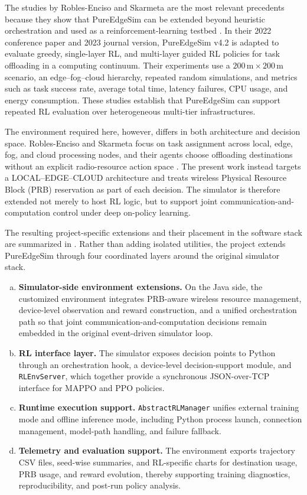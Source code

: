 The studies by Robles-Enciso and Skarmeta are the most relevant precedents because they show that PureEdgeSim can be extended beyond heuristic orchestration and used as a reinforcement-learning testbed \cite{robles2022continuum, robles2023multilayer}. In their 2022 conference paper and 2023 journal version, PureEdgeSim v4.2 is adapted to evaluate greedy, single-layer RL, and multi-layer guided RL policies for task offloading in a computing continuum. Their experiments use a \(200\,\mathrm{m} \times 200\,\mathrm{m}\) scenario, an edge--fog--cloud hierarchy, repeated random simulations, and metrics such as task success rate, average total time, latency failures, CPU usage, and energy consumption. These studies establish that PureEdgeSim can support repeated RL evaluation over heterogeneous multi-tier infrastructures.

The environment required here, however, differs in both architecture and decision space. Robles-Enciso and Skarmeta focus on task assignment across local, edge, fog, and cloud processing nodes, and their agents choose offloading destinations without an explicit radio-resource action space \cite{robles2022continuum, robles2023multilayer}. The present work instead targets a LOCAL--EDGE--CLOUD architecture and treats wireless Physical Resource Block (PRB) reservation as part of each decision. The simulator is therefore extended not merely to host RL logic, but to support joint communication-and-computation control under deep on-policy learning.

The resulting project-specific extensions and their placement in the software stack are summarized in . Rather than adding isolated utilities, the project extends PureEdgeSim through four coordinated layers around the original simulator stack.
\begin{enumerate}[(a)]
    \item \textbf{Simulator-side environment extensions.} On the Java side, the customized environment integrates PRB-aware wireless resource management, device-level observation and reward construction, and a unified orchestration path so that joint communication-and-computation decisions remain embedded in the original event-driven simulator loop.
    \item \textbf{RL interface layer.} The simulator exposes decision points to Python through an orchestration hook, a device-level decision-support module, and \texttt{RLEnvServer}, which together provide a synchronous JSON-over-TCP interface for MAPPO and PPO policies.
    \item \textbf{Runtime execution support.} \texttt{AbstractRLManager} unifies external training mode and offline inference mode, including Python process launch, connection management, model-path handling, and failure fallback.
    \item \textbf{Telemetry and evaluation support.} The environment exports trajectory CSV files, seed-wise summaries, and RL-specific charts for destination usage, PRB usage, and reward evolution, thereby supporting training diagnostics, reproducibility, and post-run policy analysis.
\end{enumerate}

